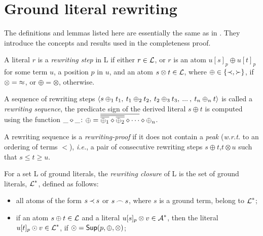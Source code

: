 \section{Ground literal rewriting}\label{se:Grewrite}
%
The definitions and lemmas listed here are essentially the same as in \cite{KW}.
They introduce the concepts and results used in the completeness proof.
%
\begin{definition} \label{def:rewriting-step}
A literal $r$ is a {\em rewriting step} in \C L if either \(r\in\mbox {$\cal L$}\), or
$r$ is an atom \(u[s]_p\oplus u[t]_p\) for some term $u$, a position $p$ in
$u$, and an atom \(s\otimes t\in \mbox {$\cal L$}\), where \(\oplus\in\{\mathbin{\prec},\mathbin{\succ}\}\),
if $\otimes=\mathbin{\approx}$, or $\oplus=\otimes$, otherwise.
\end{definition}

A sequence of rewriting steps \(\langle s\oplus_1 t_1,\: t_1\oplus_2 t_2,\:
t_2\oplus_3t_3,\: ...\:,\:t_n\oplus_n t\rangle\) is called a {\em rewriting
sequence}, the predicate sign of the derived literal \(s\oplus t\) is
computed using the function \(\_\diamond\_\): \(\oplus=\overline{\overline{\overline{\oplus _1}\diamond\overline{\oplus _2}}\diamond\cdots}\diamond\oplus _n\).

\begin{definition} \label{def:rewriting-proof}
A rewriting sequence is a {\em rewriting-proof} if it does not contain a {\em
peak} ({\it w.r.t.} to an ordering of terms $<$), {\em i.e.}, a pair of
consecutive rewriting steps \(s\oplus t\),\(t\otimes u\) such that \(s\leq
t\geq u\).
\end{definition}

\begin{definition}\label{def:rewriting-closure}
For a set \C L of ground literals, the {\em rewriting closure} of \C L is the
set of ground literals, $\mbox {$\cal L$}^\ast$, defined as follows:
\begin{itemize}\smallerspaces
\item  all atoms of the form $s\mathbin{\prec} s$ or $s\mathbin{\frown} s$, where $s$ is a ground
  term, belong to $\mbox {$\cal L$}^\ast$;
\item if an atom \(s\oplus t\in\mbox {$\cal L$}\) and a literal \(u[s]_p\otimes v\in\mbox {$\cal A$}^\ast\), then the literal \(u[t]_p\odot v\in\mbox {$\cal L$}^\ast\), if
  \(\odot=\mbox {\sf Sup}(p,\oplus,\otimes)\);
\end{itemize}
\end{definition}

